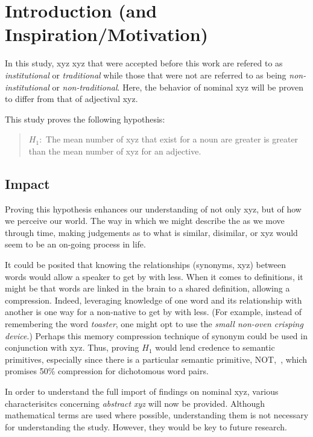 \section {Introduction (and Inspiration/Motivation)}
In this study, xyz xyz that were accepted before this work are refered to as \textit{institutional} or \textit{traditional} while those that were not are referred to as being \textit{non-institutional} or \textit{non-traditional}. Here, the behavior of nominal xyz will be proven to differ from that of adjectival xyz.  

This study proves the following hypothesis:
	\begin{quote}
		$H_{1}:$ The mean number of xyz that exist for a noun are greater is greater than the mean number of xyz for an adjective.
	\end{quote}

\subsection{Impact}
Proving this hypothesis enhances our understanding of not only xyz, but of how we perceive our world.  The way in which we might describe the as we move through time, making judgements as to what is similar, disimilar, or xyz would seem to be an on-going process in life.

It could be posited that knowing the relationships (synonyms, xyz) between words would allow a speaker to get by with less. When it comes to definitions, it might be that words are linked in the brain to a shared definition, allowing a compression.  Indeed, leveraging knowledge of one word and its relationship with another is one way for a non-native to get by with less.  (For example, instead of remembering the word \textit {toaster}, one might opt to use the \textit {small non-oven crisping device}\footnotemark.)  Perhaps this memory compression technique of synonym could be used in conjunction with xyz.  Thus, proving $H_{1}$ would lend credence to semantic primitives, especially since there is a particular semantic primitive, NOT\footnotemark,~\cite{Wierzbicka}, which promises 50\% compression for dichotomous word pairs.

In order to understand the full import of findings on nominal xyz, various characterisitcs concerning \textit{abstract xyz} will now be provided. Although mathematical terms are used where possible, understanding them is not necessary for understanding the study.  However, they would be key to future research.

